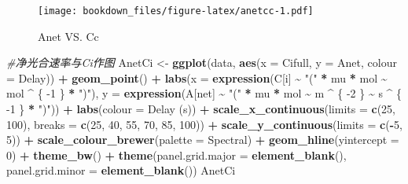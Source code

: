 \documentclass[
]{krantz}
\makeatletter
\newenvironment{Shaded}{\begin{snugshade}}{\end{snugshade}}
\newcommand{\CommentTok}[1]{\textcolor[rgb]{0.56,0.35,0.01}{\textit{#1}}}
\newcommand{\DataTypeTok}[1]{\textcolor[rgb]{0.13,0.29,0.53}{#1}}
\newcommand{\DecValTok}[1]{\textcolor[rgb]{0.00,0.00,0.81}{#1}}
\newcommand{\KeywordTok}[1]{\textcolor[rgb]{0.13,0.29,0.53}{\textbf{#1}}}
\newcommand{\NormalTok}[1]{#1}
\newcommand{\OperatorTok}[1]{\textcolor[rgb]{0.81,0.36,0.00}{\textbf{#1}}}
\newcommand{\StringTok}[1]{\textcolor[rgb]{0.31,0.60,0.02}{#1}}
\newenvironment{kframe}{%
\medskip{}
\setlength{\fboxsep}{.8em}
 \def\at@end@of@kframe{}%
 \ifinner\ifhmode%
  \def\at@end@of@kframe{\end{minipage}}%
  \begin{minipage}{\columnwidth}%
 \fi\fi%
 \def\FrameCommand##1{\hskip\@totalleftmargin \hskip-\fboxsep
 \colorbox{shadecolor}{##1}\hskip-\fboxsep
     \hskip-\linewidth \hskip-\@totalleftmargin \hskip\columnwidth}%
 \MakeFramed {\advance\hsize-\width
   \@totalleftmargin\z@ \linewidth\hsize
   \@setminipage}}%
 {\par\unskip\endMakeFramed%
 \at@end@of@kframe}
\renewenvironment{Shaded}{\begin{kframe}}{\end{kframe}}
\makeatother
\begin{document}
\begin{figure}
\centering
\texttt{[image: bookdown\_files/figure-latex/anetcc-1.pdf]}
\caption{\label{fig:anetcc}Anet VS. Cc}
\end{figure}

\begin{Shaded}
\begin{Highlighting}[]
\CommentTok{\#净光合速率与Ci作图}
\NormalTok{AnetCi \textless{}{-}}\StringTok{ }\KeywordTok{ggplot}\NormalTok{(data, }\KeywordTok{aes}\NormalTok{(}\DataTypeTok{x =}\NormalTok{ Cifull, }\DataTypeTok{y =}\NormalTok{ Anet, }\DataTypeTok{colour =}\NormalTok{ Delay)) }\OperatorTok{+}
\StringTok{  }\KeywordTok{geom\_point}\NormalTok{() }\OperatorTok{+}
\StringTok{  }\KeywordTok{labs}\NormalTok{(}\DataTypeTok{x =} \KeywordTok{expression}\NormalTok{(C[i] }\OperatorTok{\textasciitilde{}}\StringTok{ "("} \OperatorTok{*}\StringTok{ }\NormalTok{mu }\OperatorTok{*}\StringTok{ }\NormalTok{mol }\OperatorTok{\textasciitilde{}}\StringTok{ }\NormalTok{mol }\OperatorTok{\^{}}\StringTok{ }\NormalTok{\{}
    \DecValTok{{-}1}
\NormalTok{  \} }\OperatorTok{*}\StringTok{ ")"}\NormalTok{),}
  \DataTypeTok{y =} \KeywordTok{expression}\NormalTok{(A[net] }\OperatorTok{\textasciitilde{}}\StringTok{ "("} \OperatorTok{*}\StringTok{ }\NormalTok{mu }\OperatorTok{*}\StringTok{ }\NormalTok{mol }\OperatorTok{\textasciitilde{}}\StringTok{ }\NormalTok{m }\OperatorTok{\^{}}\StringTok{ }\NormalTok{\{}
    \DecValTok{{-}2}
\NormalTok{  \} }\OperatorTok{\textasciitilde{}}\StringTok{ }\NormalTok{s }\OperatorTok{\^{}}\StringTok{ }\NormalTok{\{}
    \DecValTok{{-}1}
\NormalTok{  \} }\OperatorTok{*}\StringTok{ ")"}\NormalTok{)) }\OperatorTok{+}
\StringTok{  }\KeywordTok{labs}\NormalTok{(}\DataTypeTok{colour =} \StringTok{\textquotesingle{}Delay (s)\textquotesingle{}}\NormalTok{) }\OperatorTok{+}
\StringTok{  }\KeywordTok{scale\_x\_continuous}\NormalTok{(}\DataTypeTok{limits =} \KeywordTok{c}\NormalTok{(}\DecValTok{25}\NormalTok{, }\DecValTok{100}\NormalTok{),}
                     \DataTypeTok{breaks =} \KeywordTok{c}\NormalTok{(}\DecValTok{25}\NormalTok{, }\DecValTok{40}\NormalTok{, }\DecValTok{55}\NormalTok{, }\DecValTok{70}\NormalTok{, }\DecValTok{85}\NormalTok{, }\DecValTok{100}\NormalTok{)) }\OperatorTok{+}
\StringTok{  }\KeywordTok{scale\_y\_continuous}\NormalTok{(}\DataTypeTok{limits =} \KeywordTok{c}\NormalTok{(}\OperatorTok{{-}}\DecValTok{5}\NormalTok{, }\DecValTok{5}\NormalTok{)) }\OperatorTok{+}
\StringTok{  }\KeywordTok{scale\_colour\_brewer}\NormalTok{(}\DataTypeTok{palette =} \StringTok{\textquotesingle{}Spectral\textquotesingle{}}\NormalTok{) }\OperatorTok{+}
\StringTok{  }\KeywordTok{geom\_hline}\NormalTok{(}\DataTypeTok{yintercept =} \DecValTok{0}\NormalTok{) }\OperatorTok{+}
\StringTok{  }\KeywordTok{theme\_bw}\NormalTok{() }\OperatorTok{+}
\StringTok{  }\KeywordTok{theme}\NormalTok{(}\DataTypeTok{panel.grid.major =} \KeywordTok{element\_blank}\NormalTok{(),}
        \DataTypeTok{panel.grid.minor =} \KeywordTok{element\_blank}\NormalTok{())}
\NormalTok{AnetCi}
\end{Highlighting}
\end{Shaded}
\end{document}
